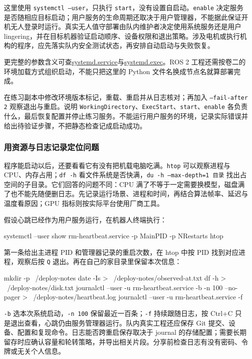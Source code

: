 \begin{note}
这里使用 \texttt{systemctl --user}，只执行 \texttt{start}，没有设置自启动。\texttt{enable} 决定服务是否随相应目标启动；用户服务的生命周期还取决于用户管理器，不能据此保证开机无人登录时运行。真实无人值守部署由队内维护者决定使用系统服务还是用户 lingering，并在目标机器验证启动顺序、设备权限和退出策略。涉及电机或执行机构的程序，应先落实队内安全测试状态，再安排自动启动与失败恢复。
\end{note}

更完整的参数含义可查\href{https://www.freedesktop.org/software/systemd/man/latest/systemd.service.html}{systemd.service}与\href{https://www.freedesktop.org/software/systemd/man/latest/systemd.exec.html}{systemd.exec}。ROS 2 工程还需按卷二的环境加载方式组织启动，不能只把这里的 Python 文件名换成节点名就算部署完成。

\begin{exercise}\label{ex:deploy-service}
在练习副本中修改环境版本标记，重载、重启并从日志核对；再加入 \texttt{--fail-after 2} 观察退出与重启。说明 \texttt{WorkingDirectory}、\texttt{ExecStart}、\texttt{start}、\texttt{enable} 各负责什么，最后恢复配置并停止练习服务。不能运行用户服务的环境，记录实际错误并给出待验证步骤，不把静态检查记成启动成功。
\end{exercise}

\subsubsection{用资源与日志记录定位问题}

程序能启动以后，还要看看它有没有把机载电脑吃满。\texttt{htop} 可以观察进程与 CPU、内存占用；\texttt{df -h} 看文件系统是否快满，\texttt{du -h --max-depth=1 目录} 找出占空间的子目录。它们回答的问题不同：CPU 满了不等于一定需要换模型，磁盘满了也不能先随便删日志。先记录运行场景、进程和时间，再结合算法帧率、延迟与温度看原因；GPU 指标则按实际平台使用厂商工具。

\begin{example}[留下一份能继续排查的记录]
假设心跳已经作为用户服务运行，在机器人终端执行：
\begin{tbash}
systemctl --user show rm-heartbeat.service -p MainPID -p NRestarts
htop
\end{tbash}
第一条给出主进程 PID 和管理器记录的重启次数，在 htop 中按 PID 找到对应进程，观察后按 \texttt{Q} 退出。再在自己的家目录里保留本次信息：
\begin{tbash}
mkdir -p ~/deploy-notes
date -Is > ~/deploy-notes/observed-at.txt
df -h > ~/deploy-notes/disk.txt
journalctl --user -u rm-heartbeat.service -b -n 100 --no-pager > ~/deploy-notes/heartbeat.log
journalctl --user -u rm-heartbeat.service -f
\end{tbash}
\texttt{-b} 选本次系统启动，\texttt{-n 100} 保留最近一百条；\texttt{-f} 持续跟随日志，按 Ctrl+C 只是退出查看，心跳仍由服务管理器运行。队内真实工程还应保存 Git 提交、设备、配置和复现命令。日志能否跨重启保存取决于 journal 的存储配置；需要长期留存时应确认容量和轮转策略，并导出相关片段。分享前检查日志有没有密码、令牌或无关个人信息。
\end{example}

